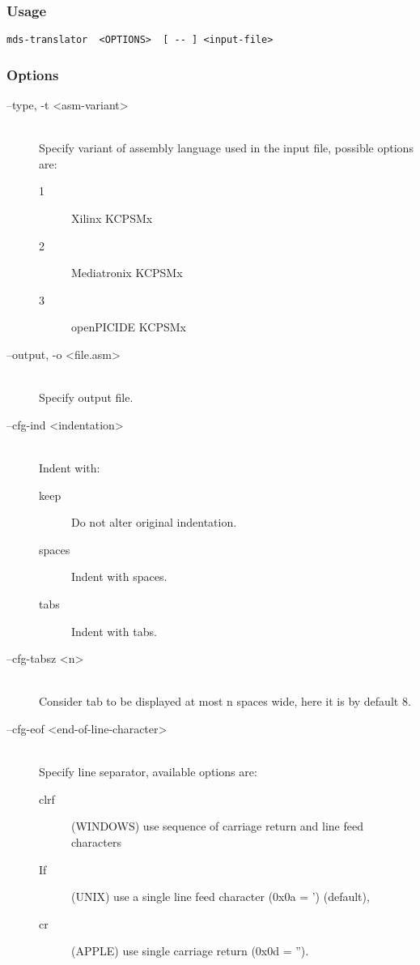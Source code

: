         \subsubsection{Usage}
            \verb'mds-translator  <OPTIONS>  [ -- ] <input-file>'

        \subsubsection{Options}
            \begin{description}
                \item[--type, -t <asm-variant>]~\\
                    Specify variant of assembly language used in the input file, possible options are:
                    \begin{description}
                        \item [1] Xilinx KCPSMx
                        \item [2] Mediatronix KCPSMx
                        \item [3] openPICIDE KCPSMx
                    \end{description}

                \item[--output, -o <file.asm>]~\\
                    Specify output file.

                \item[--cfg-ind <indentation>]~\\
                    Indent with:
                    \begin{description}
                        \item [keep] Do not alter original indentation.
                        \item [spaces] Indent with spaces.
                        \item [tabs] Indent with tabs.
                    \end{description}

                \item[--cfg-tabsz <n>]~\\
                    Consider tab to be displayed at most n spaces wide, here it is by default 8.

                \item[--cfg-eof <end-of-line-character>]~\\
                    Specify line separator, available options are:
                    \begin{description}
                        \item [clrf] (WINDOWS) use sequence of carriage return and line feed characters
                        \item [If] (UNIX) use a single line feed character (0x0a = ') (default),
                        \item [cr] (APPLE) use single carriage return (0x0d = '').
                    \end{description}


\end{description}
